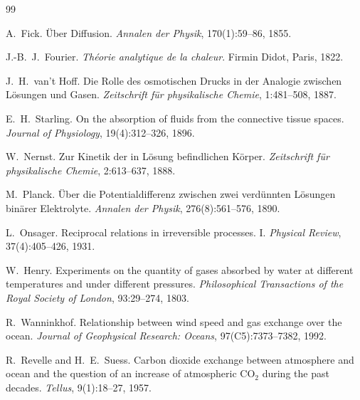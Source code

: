 ﻿\documentclass[a4paper,12pt]{article}
\theoremstyle{definition}
\begin{document}
\begin{thebibliography}{99}

A.\ Fick.
\newblock Über Diffusion.
\newblock \textit{Annalen der Physik}, 170(1):59--86, 1855.

J.-B.\ J.\ Fourier.
\newblock \textit{Théorie analytique de la chaleur}.
\newblock Firmin Didot, Paris, 1822.

J.\ H.\ van't Hoff.
\newblock Die Rolle des osmotischen Drucks in der Analogie zwischen Lösungen und Gasen.
\newblock \textit{Zeitschrift für physikalische Chemie}, 1:481--508, 1887.

E.\ H.\ Starling.
\newblock On the absorption of fluids from the connective tissue spaces.
\newblock \textit{Journal of Physiology}, 19(4):312--326, 1896.

W.\ Nernst.
\newblock Zur Kinetik der in Lösung befindlichen Körper.
\newblock \textit{Zeitschrift für physikalische Chemie}, 2:613--637, 1888.

M.\ Planck.
\newblock Über die Potentialdifferenz zwischen zwei verdünnten Lösungen
         binärer Elektrolyte.
\newblock \textit{Annalen der Physik}, 276(8):561--576, 1890.

L.\ Onsager.
\newblock Reciprocal relations in irreversible processes. I.
\newblock \textit{Physical Review}, 37(4):405--426, 1931.

W.\ Henry.
\newblock Experiments on the quantity of gases absorbed by water at different
         temperatures and under different pressures.
\newblock \textit{Philosophical Transactions of the Royal Society of London},
         93:29--274, 1803.

R.\ Wanninkhof.
\newblock Relationship between wind speed and gas exchange over the ocean.
\newblock \textit{Journal of Geophysical Research: Oceans},
         97(C5):7373--7382, 1992.

R.\ Revelle and H.\ E.\ Suess.
\newblock Carbon dioxide exchange between atmosphere and ocean and the question
         of an increase of atmospheric CO$_2$ during the past decades.
\newblock \textit{Tellus}, 9(1):18--27, 1957.


\end{thebibliography}
\end{document}

